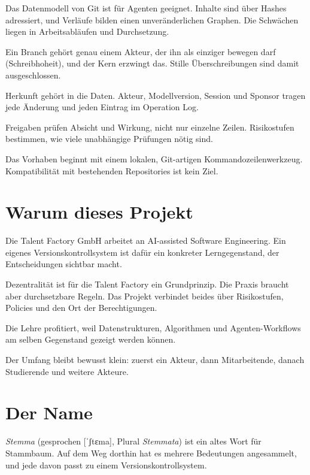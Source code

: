 \startitemize[n]
\item Das Datenmodell von Git ist für Agenten geeignet.
Inhalte sind über Hashes adressiert, und Verläufe bilden einen unveränderlichen Graphen.
Die Schwächen liegen in Arbeitsabläufen und Durchsetzung.
\item Ein Branch gehört genau einem Akteur, der ihn als einziger bewegen darf
(Schreibhoheit), und der Kern erzwingt das.
Stille Überschreibungen sind damit ausgeschlossen.
\item Herkunft gehört in die Daten. Akteur, Modellversion,
Session und Sponsor tragen jede Änderung und jeden Eintrag im Operation Log.
\item Freigaben prüfen Absicht und Wirkung, nicht nur einzelne Zeilen.
Risikostufen bestimmen, wie viele unabhängige Prüfungen nötig sind.
\item Das Vorhaben beginnt mit einem lokalen, Git-artigen Kommandozeilenwerkzeug.
Kompatibilität mit bestehenden Repositories ist kein Ziel.
\stopitemize

\section{Warum dieses Projekt}

\startitemize
\item Die Talent Factory GmbH arbeitet an AI-assisted Software Engineering.
Ein eigenes Versionskontrollsystem ist dafür ein konkreter Lerngegenstand,
der Entscheidungen sichtbar macht.
\item Dezentralität ist für die Talent Factory ein Grundprinzip.
Die Praxis braucht aber durchsetzbare Regeln. Das Projekt verbindet beides über Risikostufen,
Policies und den Ort der Berechtigungen.
\item Die Lehre profitiert, weil Datenstrukturen, Algorithmen und Agenten-Workflows am selben
Gegenstand gezeigt werden können.
\item Der Umfang bleibt bewusst klein: zuerst ein Akteur, dann Mitarbeitende,
danach Studierende und weitere Akteure.
\stopitemize

\section{Der Name}

{\em Stemma} (gesprochen [ˈʃtɛma], Plural {\em Stemmata}) ist ein altes Wort für Stammbaum.
Auf dem Weg dorthin hat es mehrere Bedeutungen angesammelt,
und jede davon passt zu einem Versionskontrollsystem.

